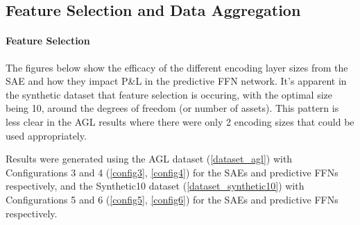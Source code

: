 \documentclass[a4paper,11pt,oneside]{article}
\theoremstyle{plain}
\theoremstyle{definition}
\begin{document}
\subsection{Feature Selection and Data Aggregation}

\paragraph{Feature Selection}

The figures below show the efficacy of the different encoding layer sizes from the SAE and how they impact P\&L in the predictive FFN network. It's apparent in the synthetic dataset that feature selection is occuring, with the optimal size being 10, around the degrees of freedom (or number of assets). This pattern is less clear in the AGL results where there were only 2 encoding sizes that could be used appropriately.\newline

Results were generated using the AGL dataset (\ref{dataset_agl}) with Configurations 3 and 4 (\ref{config3}, \ref{config4}) for the SAEs and predictive FFNs respectively, and the Synthetic10 dataset (\ref{dataset_synthetic10}) with Configurations 5 and 6 (\ref{config5}, \ref{config6}) for the  SAEs and predictive FFNs respectively.
\end{document}
